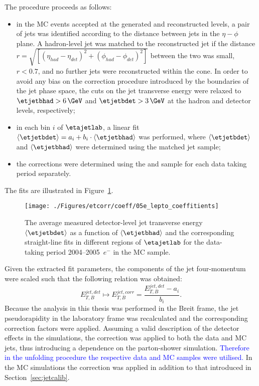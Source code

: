 The procedure proceeds as follows:
\begin{itemize}
 \item in the MC events accepted at the generated and reconstructed levels, a pair of jets was identified according to the distance between jets in the $\eta-\phi$ plane. A hadron-level jet was matched to the reconstructed jet if the distance $r=\sqrt{\left[\left(\eta_{had}-\eta_{det}\right)^2 + \left(\phi_{had}-\phi_{det}\right)^2\right]}$ between the two was small, $r<0.7$, and no further jets were reconstructed within the cone. In order to avoid any bias on the correction procedure introduced by the boundaries of the jet phase space, the cuts on the jet transverse energy were relaxed to $\etjetbhad>6\,\GeV$ and $\etjetbdet>3\,\GeV$ at the hadron and detector levels, respectively;
 \item in each bin $i$ of $\etajetlab$, a linear fit $\left\langle\etjetbdet\right\rangle = a_i + b_i\cdot\left\langle\etjetbhad\right\rangle$ was performed, where $\left\langle\etjetbdet\right\rangle$ and $\left\langle\etjetbhad\right\rangle$ were determined using the matched jet sample;
 \item the corrections were determined using the \ariadne and \lepto sample for each data taking period separately. 
\end{itemize}
The fits are illustrated in Figure~\ref{fig:05e_lepto_coeffitients}.
\begin{figure}[p]
\centering
\texttt{[image: ./Figures/etcorr/coeff/05e\_lepto\_coeffitients]}
\caption{The average measured detector-level jet transverse energy $\left\langle\etjetbdet\right\rangle$ as a function of $\left\langle\etjetbhad\right\rangle$ and the corresponding straight-line fits in different regions of $\etajetlab$ for the data-taking period 2004--2005~$e^-$ in the \lepto MC sample.}
\label{fig:05e_lepto_coeffitients}
\end{figure}

Given the extracted fit parameters, the components of the jet four-momentum were scaled such that the following relation was obtained:
 \begin{equation}
  E_{T,B}^{jet,det} \mapsto E_{T,B}^{jet,corr} = \frac{E_{T,B}^{jet,det} - a_i}{b_i}.
 \end{equation}
Because the analysis in this thesis was performed in the Breit frame, the jet pseudorapidity in the laboratory frame was recalculated and the corresponding correction factors were applied. Assuming a valid description of the detector effects in the simulations, the correction was applied to both the data and MC jets, thus introducing a dependence on the parton-shower simulation. \textcolor{blue}{Therefore in the unfolding procedure the respective data and MC samples were utilised.} In the MC simulations the correction was applied in addition to that introduced in Section~\ref{sec:jetcalib}.
